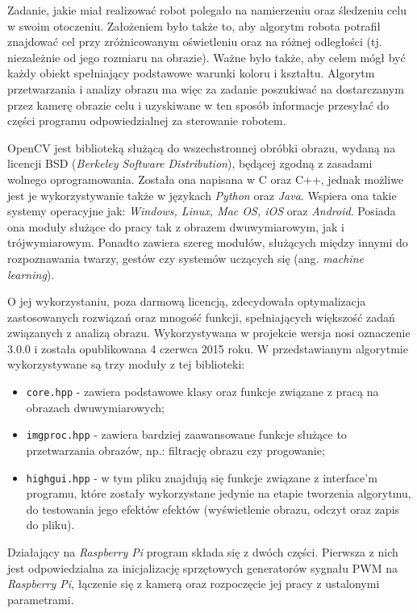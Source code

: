 Zadanie, jakie miał realizować robot polegało na namierzeniu oraz śledzeniu celu w swoim otoczeniu. Założeniem było także to, aby algorytm robota potrafił znajdować cel przy zróżnicowanym oświetleniu oraz na różnej odległości (tj. niezależnie od jego rozmiaru na obrazie). Ważne było także, aby celem mógł być każdy obiekt spełniający podstawowe warunki koloru i kształtu. Algorytm przetwarzania i analizy obrazu ma więc za zadanie poszukiwać na dostarczanym przez kamerę obrazie celu i uzyskiwane w ten sposób informacje przesyłać do części programu odpowiedzialnej za sterowanie robotem.

OpenCV jest biblioteką służącą do wszechstronnej obróbki obrazu, wydaną na licencji BSD (\textit{Berkeley Software Distribution}), będącej zgodną z zasadami wolnego oprogramowania. Została ona napisana w C oraz C++, jednak możliwe jest je wykorzystywanie także w językach \textit{Python} oraz \textit{Java}. Wspiera ona takie systemy operacyjne jak: \textit{Windows, Linux, Mac OS, iOS} oraz \textit{Android}. Posiada ona moduły służące do pracy tak z obrazem dwuwymiarowym, jak i trójwymiarowym. Ponadto zawiera szereg modułów, służących między innymi do rozpoznawania twarzy, gestów czy systemów uczących się (ang. \textit{machine learning}).

O jej wykorzystaniu, poza darmową licencją, zdecydowała optymalizacja zastosowanych rozwiązań oraz mnogość funkcji, spełniających większość zadań związanych z analizą obrazu. Wykorzystywana w projekcie wersja nosi oznaczenie 3.0.0 i została opublikowana 4 czerwca 2015 roku. W przedstawianym algorytmie wykorzystywane są trzy moduły z tej biblioteki:
\begin{itemize}
\item \texttt{core.hpp} - zawiera podstawowe klasy oraz funkcje związane z pracą na obrazach dwuwymiarowych;
\item \texttt{imgproc.hpp} - zawiera bardziej zaawansowane funkcje służące to przetwarzania obrazów, np.: filtrację obrazu czy progowanie;
\item \texttt{highgui.hpp} - w tym pliku znajdują się funkcje związane z interface'm programu, które zostały wykorzystane jedynie na etapie tworzenia algorytmu, do testowania jego efektów efektów (wyświetlenie obrazu, odczyt oraz zapis do pliku).
\end{itemize}

Działający na \textit{Raspberry Pi} program składa się z dwóch części. Pierwsza z nich jest odpowiedzialna za inicjalizację sprzętowych generatorów sygnału PWM na \textit{Raspberry Pi}, łączenie się z kamerą oraz rozpoczęcie jej pracy z ustalonymi parametrami.


